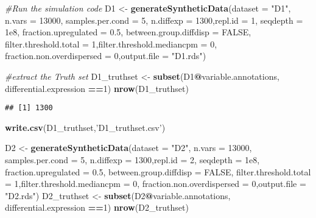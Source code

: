 \documentclass[]{article}
\newenvironment{Shaded}{\begin{snugshade}}{\end{snugshade}}
\newcommand{\CommentTok}[1]{\textcolor[rgb]{0.56,0.35,0.01}{\textit{#1}}}
\newcommand{\DataTypeTok}[1]{\textcolor[rgb]{0.13,0.29,0.53}{#1}}
\newcommand{\DecValTok}[1]{\textcolor[rgb]{0.00,0.00,0.81}{#1}}
\newcommand{\FloatTok}[1]{\textcolor[rgb]{0.00,0.00,0.81}{#1}}
\newcommand{\KeywordTok}[1]{\textcolor[rgb]{0.13,0.29,0.53}{\textbf{#1}}}
\newcommand{\NormalTok}[1]{#1}
\newcommand{\OperatorTok}[1]{\textcolor[rgb]{0.81,0.36,0.00}{\textbf{#1}}}
\newcommand{\OtherTok}[1]{\textcolor[rgb]{0.56,0.35,0.01}{#1}}
\newcommand{\StringTok}[1]{\textcolor[rgb]{0.31,0.60,0.02}{#1}}
\begin{document}
\begin{Shaded}
\begin{Highlighting}[]
\CommentTok{#Run the simulation code}
\NormalTok{D1 <-}\StringTok{ }\KeywordTok{generateSyntheticData}\NormalTok{(}\DataTypeTok{dataset =} \StringTok{"D1"}\NormalTok{, }\DataTypeTok{n.vars =} \DecValTok{13000}\NormalTok{,}
             \DataTypeTok{samples.per.cond =} \DecValTok{5}\NormalTok{, }\DataTypeTok{n.diffexp =} \DecValTok{1300}\NormalTok{,}\DataTypeTok{repl.id =} \DecValTok{1}\NormalTok{, }\DataTypeTok{seqdepth =} \FloatTok{1e8}\NormalTok{,}
             \DataTypeTok{fraction.upregulated =} \FloatTok{0.5}\NormalTok{, }\DataTypeTok{between.group.diffdisp =} \OtherTok{FALSE}\NormalTok{,}
             \DataTypeTok{filter.threshold.total =} \DecValTok{1}\NormalTok{,}\DataTypeTok{filter.threshold.mediancpm =} \DecValTok{0}\NormalTok{,}
             \DataTypeTok{fraction.non.overdispersed =} \DecValTok{0}\NormalTok{,}\DataTypeTok{output.file =} \StringTok{"D1.rds"}\NormalTok{)}

\CommentTok{#extract the Truth set}
\NormalTok{D1_truthset <-}\StringTok{ }\KeywordTok{subset}\NormalTok{(D1}\OperatorTok{@}\NormalTok{variable.annotations, differential.expression }\OperatorTok{==}\DecValTok{1}\NormalTok{)}
\KeywordTok{nrow}\NormalTok{(D1_truthset)}
\end{Highlighting}
\end{Shaded}

\begin{verbatim}
## [1] 1300
\end{verbatim}

\begin{Shaded}
\begin{Highlighting}[]
\KeywordTok{write.csv}\NormalTok{(D1_truthset,}\StringTok{'D1_truthset.csv'}\NormalTok{)}
\end{Highlighting}
\end{Shaded}

\begin{Shaded}
\begin{Highlighting}[]
\NormalTok{D2 <-}\StringTok{ }\KeywordTok{generateSyntheticData}\NormalTok{(}\DataTypeTok{dataset =} \StringTok{"D2"}\NormalTok{, }\DataTypeTok{n.vars =} \DecValTok{13000}\NormalTok{,}
             \DataTypeTok{samples.per.cond =} \DecValTok{5}\NormalTok{, }\DataTypeTok{n.diffexp =} \DecValTok{1300}\NormalTok{,}\DataTypeTok{repl.id =} \DecValTok{2}\NormalTok{, }\DataTypeTok{seqdepth =} \FloatTok{1e8}\NormalTok{,}
             \DataTypeTok{fraction.upregulated =} \FloatTok{0.5}\NormalTok{, }\DataTypeTok{between.group.diffdisp =} \OtherTok{FALSE}\NormalTok{,}
             \DataTypeTok{filter.threshold.total =} \DecValTok{1}\NormalTok{,}\DataTypeTok{filter.threshold.mediancpm =} \DecValTok{0}\NormalTok{,}
             \DataTypeTok{fraction.non.overdispersed =} \DecValTok{0}\NormalTok{,}\DataTypeTok{output.file =} \StringTok{"D2.rds"}\NormalTok{)}
\NormalTok{D2_truthset <-}\StringTok{ }\KeywordTok{subset}\NormalTok{(D2}\OperatorTok{@}\NormalTok{variable.annotations, differential.expression }\OperatorTok{==}\DecValTok{1}\NormalTok{)}
\KeywordTok{nrow}\NormalTok{(D2_truthset)}
\end{Highlighting}
\end{Shaded}
\end{document}
